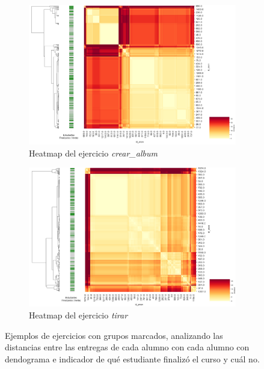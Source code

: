 \documentclass[11pt,a4paper,twoside,openany]{tesis}
\begin{document}
\newpage
\begin{figure}[H]
    \centering
    \begin{subfigure}{0.45\textwidth}
        \includegraphics[width=\linewidth]{imagenes/heatmap-2-crear album.png}
        \caption{Heatmap del ejercicio \emph{crear\_album}}
        \label{fig:figura1}
    \end{subfigure}
    \hfill
    \begin{subfigure}{0.45\textwidth}
        \includegraphics[width=\linewidth]{imagenes/heatmap-2-tirar.png}
        \caption{Heatmap del ejercicio \emph{tirar}}
        \label{fig:figura2}
    \end{subfigure}
    \caption{Ejemplos de ejercicios con grupos marcados, analizando las distancias entre las entregas de cada alumno con cada alumno con dendograma e indicador de qué estudiante finalizó el curso y cuál no.}
    \label{fig:figuras_juntas_tres}
\end{figure}
\end{document}
